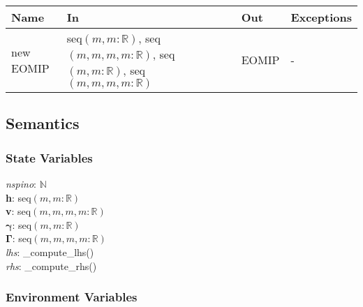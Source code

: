 \documentclass[12pt, titlepage]{article}
\begin{document}
\begin{center}
	\begin{tabular}{p{2.3cm} p{4cm} p{4cm} p{2cm}}
		\hline
		\textbf{Name} & \textbf{In} & \textbf{Out} & \textbf{Exceptions} \\
		\hline
		new EOMIP & seq$(m,m:\mathbb{R})$, seq$(m,m,m,m:\mathbb{R})$, 
		seq$(m,m:\mathbb{R})$, seq$(m,m,m,m:\mathbb{R})$& EOMIP & - \\
		\hline
	\end{tabular}
\end{center}

\subsection{Semantics}

\subsubsection{State Variables}
\textit{nspino}: $\mathbb{N}$\\
\textbf{h}: seq$(m,m:\mathbb{R})$\\
\textbf{v}: seq$(m,m,m,m:\mathbb{R})$\\
$\boldsymbol{\gamma}$: seq$(m,m:\mathbb{R})$\\
$\boldsymbol{\Gamma}$: seq$(m,m,m,m:\mathbb{R})$\\
\textit{lhs}: \_compute\_lhs()\\
\textit{rhs}: \_compute\_rhs()

\subsubsection{Environment Variables}
\end{document}
